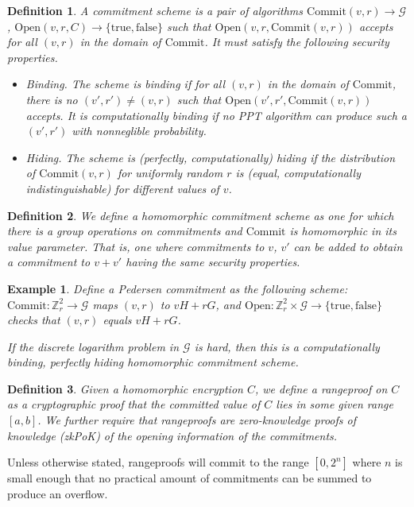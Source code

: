 \documentclass[letterpaper]{article}
\newtheorem{defn}{Definition}
\newtheorem{expl}{Example}
\newcommand{\Commit}{\mathrm{Commit}}
\newcommand{\Open}{\mathrm{Open}}
\newcommand{\truth}{\{\mathrm{true}, \mathrm{false}\}}
\begin{document}
\begin{defn} A \emph{commitment scheme} is a pair of algorithms
$\Commit(v, r)\to\mathcal{G}$, $\Open(v, r, C)\to\truth$ such that
$\Open(v, r, \Commit(v, r))$ accepts for all $(v, r)$ in the domain
of $\Commit$. It must satisfy the following security properties.
\begin{itemize}
\item \emph{Binding.} The scheme is \emph{binding} if for all $(v, r)$ in the
domain of $\Commit$, there is no $(v',r')\neq(v,r)$ such that
$\Open(v', r', \Commit(v, r))$ accepts.
It is \emph{computationally binding} if no PPT algorithm can produce such a
$(v', r')$ with nonneglible probability.
\item \emph{Hiding.} The scheme is \emph{(perfectly, computationally) hiding}
if the distribution of $\mathrm{Commit}(v, r)$ for uniformly random $r$ is
(equal, computationally indistinguishable) for different values of $v$.
\end{itemize}
\end{defn}
\begin{defn} We define a \emph{homomorphic commitment scheme} as one
for which there is a group operations on commitments and $\Commit$ is
homomorphic in its value parameter. That is, one where commitments to
$v$, $v'$ can be added to obtain a commitment to $v+v'$ having the
same security properties.
\end{defn}

\begin{expl} Define a \emph{Pedersen commitment} as the following scheme:
$\Commit:\mathbb{Z}_r^2\to\mathcal{G}$ maps $(v, r)$ to $vH + rG$, and
$\Open:\mathbb{Z}_r^2\times\mathcal{G}\to\truth$ checks that $(v, r)$
equals $vH + rG$.

If the discrete logarithm problem in  $\mathcal{G}$ is hard, then this
is a computationally binding, perfectly hiding homomorphic commitment
scheme\cite{pedersen2001}.
\end{expl}

\begin{defn} Given a homomorphic encryption $C$, we define a
\emph{rangeproof} on $C$ as a cryptographic proof that the committed
value of $C$ lies in some given range $[a, b]$. We further require
that rangeproofs are zero-knowledge proofs of knowledge (zkPoK) of
the opening information of the commitments.
\end{defn}
Unless otherwise stated, rangeproofs will commit to the range
$[0,2^n]$ where $n$ is small enough that no practical amount
of commitments can be summed to produce an overflow.
\end{document}
